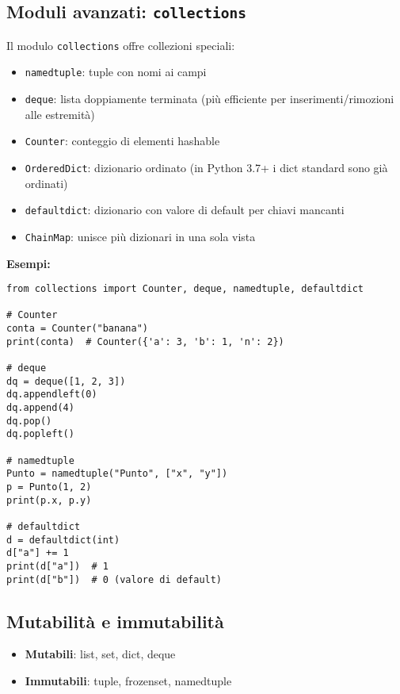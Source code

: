 \documentclass[a4paper,12pt]{article}
\begin{document}
\subsection*{Moduli avanzati: \texttt{collections}}
Il modulo \texttt{collections} offre collezioni speciali:
\begin{itemize}
    \item \texttt{namedtuple}: tuple con nomi ai campi
    \item \texttt{deque}: lista doppiamente terminata (più efficiente per inserimenti/rimozioni alle estremità)
    \item \texttt{Counter}: conteggio di elementi hashable
    \item \texttt{OrderedDict}: dizionario ordinato (in Python 3.7+ i dict standard sono già ordinati)
    \item \texttt{defaultdict}: dizionario con valore di default per chiavi mancanti
    \item \texttt{ChainMap}: unisce più dizionari in una sola vista
\end{itemize}

\textbf{Esempi:}
\begin{lstlisting}
from collections import Counter, deque, namedtuple, defaultdict

# Counter
conta = Counter("banana")
print(conta)  # Counter({'a': 3, 'b': 1, 'n': 2})

# deque
dq = deque([1, 2, 3])
dq.appendleft(0)
dq.append(4)
dq.pop()
dq.popleft()

# namedtuple
Punto = namedtuple("Punto", ["x", "y"])
p = Punto(1, 2)
print(p.x, p.y)

# defaultdict
d = defaultdict(int)
d["a"] += 1
print(d["a"])  # 1
print(d["b"])  # 0 (valore di default)
\end{lstlisting}

\subsection*{Mutabilità e immutabilità}
\begin{itemize}
    \item \textbf{Mutabili}: list, set, dict, deque
    \item \textbf{Immutabili}: tuple, frozenset, namedtuple
\end{itemize}
\end{document}
